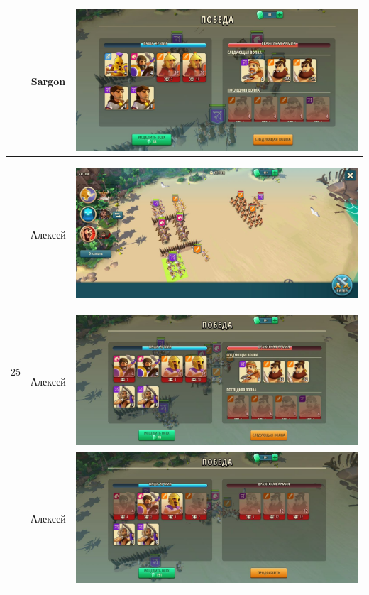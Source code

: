 \begin{longtable}{|c|c|c|}
    & Sargon &
    \includegraphics[width=0.75\linewidth]{./parts/media/TreasureHunt/25/sargon/photo_2022-04-07_09-58-27.jpg} \\
    \hline
    \multirow{10}{*}{25} & Алексей &
    \hypertarget{fight25}{\includegraphics[width=0.75\linewidth]{./parts/media/TreasureHunt/25/alexey/photo_2022-04-07_10-09-19.jpg}} \\
    & Алексей &
    \includegraphics[width=0.75\linewidth]{./parts/media/TreasureHunt/25/alexey/photo_2022-04-07_10-09-08.jpg} \\
    & Алексей &
    \includegraphics[width=0.75\linewidth]{./parts/media/TreasureHunt/25/alexey/photo_2022-04-07_10-09-24.jpg} \\

\end{longtable}
